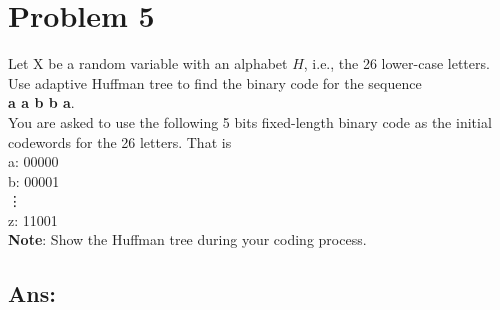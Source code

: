 \documentclass[a4paper, 11pt, oneside]{article} %
\begin{document}
\clearpage

\section*{Problem 5}
Let X be a random variable with an alphabet $H$, i.e., the 26 lower-case letters.
Use adaptive Huffman tree to find the binary code for the sequence \\ \textbf{a a b b a}.\\
You are asked to use the following 5 bits fixed-length binary code as the initial codewords for
the 26 letters. That is \\
a: 00000 \\
b: 00001 \\
\vdots \\
z: 11001 \\
\textbf{Note}: Show the Huffman tree during your coding process.
\subsection*{Ans:}
\end{document}
